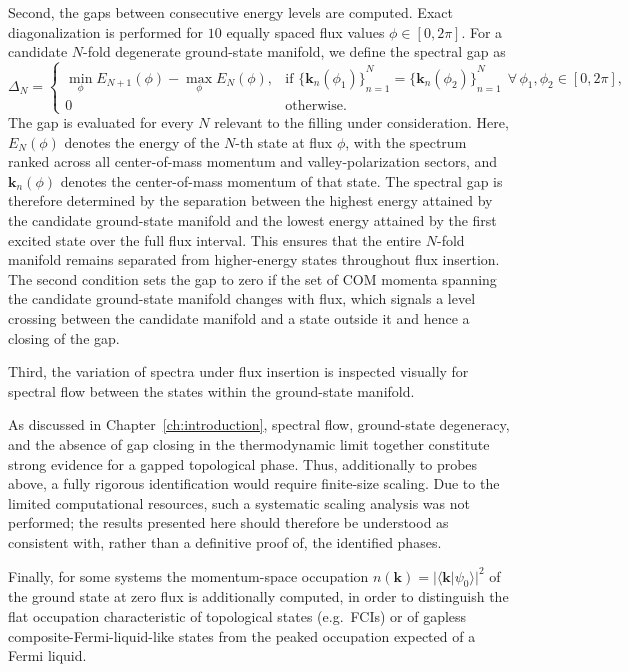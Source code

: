 Second, the gaps between consecutive energy levels are computed. Exact diagonalization is performed for $10$ equally spaced flux values $\phi \in [0,2\pi]$. For a candidate $N$-fold degenerate ground-state manifold, we define the spectral gap as
\begin{equation}
    \Delta_N =
    \begin{cases}
        \min_{\phi} E_{N+1}(\phi) - \max_{\phi} E_N(\phi), & \text{if } {\{\mathbf{k}_n(\phi_1)\}}_{n=1}^{N} = {\{\mathbf{k}_n(\phi_2)\}}_{n=1}^{N} \ \ \forall\, \phi_1, \phi_2 \in [0, 2\pi], \\[4pt]
        0 & \text{otherwise.}
    \end{cases}
    \label{eq:spectral_gap}
\end{equation}
The gap is evaluated for every $N$ relevant to the filling under consideration. Here, $E_N(\phi)$ denotes the energy of the $N$-th state at flux $\phi$, with the spectrum ranked across all center-of-mass momentum and valley-polarization sectors, and $\mathbf{k}_n(\phi)$ denotes the center-of-mass momentum of that state. The spectral gap is therefore determined by the separation between the highest energy attained by the candidate ground-state manifold and the lowest energy attained by the first excited state over the full flux interval. This ensures that the entire $N$-fold manifold remains separated from higher-energy states throughout flux insertion. The second condition sets the gap to zero if the set of COM momenta spanning the candidate ground-state manifold changes with flux, which signals a level crossing between the candidate manifold and a state outside it and hence a closing of the gap.

Third, the variation of spectra under flux insertion is inspected visually for spectral flow between the states within the ground-state manifold.

As discussed in Chapter~\ref{ch:introduction}, spectral flow, ground-state degeneracy, and the absence of gap closing in the thermodynamic limit together constitute strong evidence for a gapped topological phase. Thus, additionally to probes above, a fully rigorous identification would require finite-size scaling. Due to the limited computational resources, such a systematic scaling analysis was not performed; the results presented here should therefore be understood as consistent with, rather than a definitive proof of, the identified phases.

Finally, for some systems the momentum-space occupation $n(\mathbf{k}) = |\langle \mathbf{k} | \psi_0 \rangle|^2$ of the ground state at zero flux is additionally computed, in order to distinguish the flat occupation characteristic of topological states (e.g.\ FCIs) or of gapless composite-Fermi-liquid-like states from the peaked occupation expected of a Fermi liquid.


